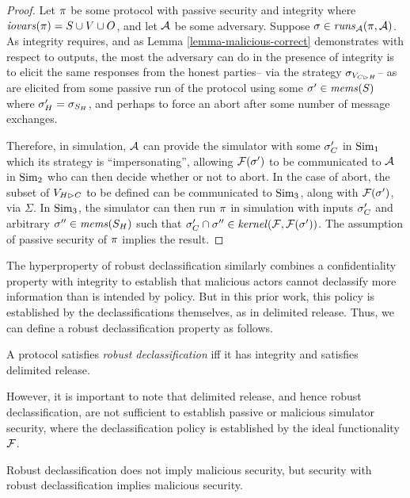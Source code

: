 \begin{proof}
  Let $\pi$ be some protocol with passive security and integrity
  where $\mathit{iovars}(\pi) = S \cup V \cup O$, and let $\mathcal{A}$ be some
  adversary. Suppose $\sigma \in \mathit{runs}_{\mathcal{A}}(\pi,\mathcal{A})$.
  As integrity requires, and as Lemma \ref{lemma-malicious-correct}
  demonstrates with respect to outputs, the most the adversary can do
  in the presence of integrity is to elicit the same responses from
  the honest parties-- via the strategy $\sigma_{V_{C \rhd H}}$-- as
  are elicited from some passive run of the protocol using
  some $\sigma' \in \mathit{mems}(S)$ where $\sigma'_H = \sigma_{S_H}$,
  and perhaps to force an abort after some number of message
  exchanges.

  Therefore, in simulation, $\mathcal{A}$ can provide the simulator
  with some $\sigma'_C$ in $\mathrm{Sim}_1$ which its strategy is ``impersonating'',
  allowing $\mathcal{F}(\sigma')$ to
  be communicated to $\mathcal{A}$ in $\mathrm{Sim}_2$ who can then
  decide whether or not to abort. In the case of abort, the
  subset of $V_{H \rhd C}$ to be defined can be communicated to
  $\mathrm{Sim}_3$, along with $\mathcal{F}(\sigma')$, via $\Sigma$. 
  In $\mathrm{Sim}_3$, the simulator can then run $\pi$ in simulation
  with inputs $\sigma'_C$ and arbitrary $\sigma'' \in \mathit{mems}(S_H)$
  such that $\sigma'_C \cap \sigma'' \in \mathit{kernel}(\mathcal{F},\mathcal{F}(\sigma'))$.
  The assumption of passive security of $\pi$ implies the result.
\end{proof}

The hyperproperty of robust declassification \cite{930133} similarly
combines a confidentiality property with integrity to establish that
malicious actors cannot declassify more information than is intended
by policy. But in this prior work, this policy is established
by the declassifications themselves, as in delimited release.
Thus, we can define a robust declassification property as follows. 
\begin{definition}
  A protocol satisfies \emph{robust declassification} iff it has integrity and
  satisfies delimited release. 
\end{definition}
However, it is important to note that delimited release, and
hence robust declassification, are not sufficient to establish
passive or malicious simulator security, where the declassification
policy is established by the ideal functionality $\mathcal{F}$. 
\begin{theorem}
  Robust declassification does not imply malicious security, but
  security with robust declassification implies malicious security.
\end{theorem}

